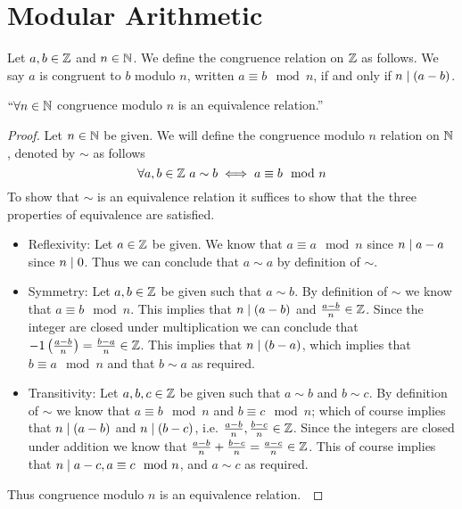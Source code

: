    \section{Modular Arithmetic}
        \begin{definition}
            Let $a, b \in \mathbb{Z}$ and $n \in \mathbb{N}$. We define the congruence relation
            on $\mathbb{Z}$ as follows. We say $a$ is congruent to $b$ modulo
            $n$, written $a \equiv b \mod n$, if and only if $n \mid (a - b)$.
        \end{definition}
        \begin{lemma}
            $``\forall n \in \mathbb{N}$ congruence modulo $n$ is an equivalence relation.''
            \label{Congruence Equivalence Relation}
        \end{lemma}
        \begin{proof}
            Let $n \in \mathbb{N}$ be given. We will define the congruence modulo $n$ relation 
            on $\mathbb{N}$, denoted by $\sim$ as follows
            \begin{equation}
                \forall a, b \in \mathbb{Z} \ a \sim b \iff a \equiv b \mod n
            \end{equation}
            To show that $\sim$ is an equivalence relation it suffices to show that
            the three properties of equivalence are satisfied.
            \begin{itemize}
                \item
                    Reflexivity: Let $a \in \mathbb{Z}$ be given. We know that $a \equiv a \mod n$
                    since $n \mid a - a$ since $n \mid 0$. Thus we can conclude that
                    $a \sim a$ by definition of $\sim$.
                \item
                    Symmetry: Let $a, b \in \mathbb{Z}$ be given such that $a \sim b$. By definition
                    of $\sim$ we know that $a \equiv b \mod n$. This implies that $n \mid (a - b)$
                    and $\frac{a - b}{n} \in \mathbb{Z}$. Since the integer are closed under multiplication
                    we can conclude that $-1 \left(\frac{a - b}{n}\right) = \frac{b - a}{n} \in \mathbb{Z}$.
                    This implies that $n \mid (b - a)$, which implies that $b \equiv a \mod n$ and
                    that $b \sim a$ as required.
                \item
                    Transitivity: Let $a, b, c \in \mathbb{Z}$ be given such that $a \sim b$ and 
                    $b \sim c$. By definition of $\sim$ we know that $a \equiv b \mod n$ and 
                    $b \equiv c \mod n$; which of course implies that $n \mid (a - b)$
                    and $n \mid (b - c)$, i.e. $\frac{a - b}{n}, \frac{b - c}{n} \in \mathbb{Z}$.
                    Since the integers are closed under addition we know that 
                    $\frac{a - b}{n} + \frac{b - c}{n} = \frac{a - c}{n} \in \mathbb{Z}$.
                    This of course implies that $n \mid a - c, a \equiv c \mod n$, and
                    $a \sim c$ as required.
            \end{itemize}
            Thus congruence modulo $n$ is an equivalence relation.~\QED
        \end{proof}
